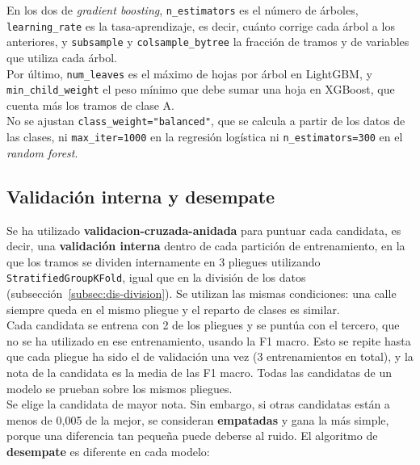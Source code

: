 En los dos de \textit{gradient boosting}, \texttt{n\_estimators} es el número de árboles, \texttt{learning\_rate} es la \gls{tasa-aprendizaje}, es decir, cuánto corrige cada árbol a los anteriores, y \texttt{subsample} y \texttt{colsample\_bytree} la fracción de tramos y de variables que utiliza cada árbol.
\\

Por último, \texttt{num\_leaves} es el máximo de hojas por árbol en LightGBM, y \texttt{min\_child\_weight} el peso mínimo que debe sumar una hoja en XGBoost, que cuenta más los tramos de clase A.
\\

No se ajustan \texttt{class\_\allowbreak weight=\allowbreak "balanced"}, que se calcula a partir de los datos de las clases, ni \texttt{max\_iter=1000} en la regresión logística ni \texttt{n\_estimators=300} en el \textit{random forest}.
\\

\subsection{Validación interna y desempate}
\label{subsec:dis-validacion-interna}

Se ha utilizado \textbf{\gls{validacion-cruzada-anidada}} \parencite{kudasova_nested_cv} para puntuar cada candidata, es decir, una \textbf{validación interna} dentro de cada partición de entrenamiento, en la que los tramos se dividen internamente en 3 pliegues utilizando \texttt{StratifiedGroupKFold}, igual que en la división de los datos (subsección~\ref{subsec:dis-division}). Se utilizan las mismas condiciones: una calle siempre queda en el mismo pliegue y el reparto de clases es similar.
\\

Cada candidata se entrena con 2 de los pliegues y se puntúa con el tercero, que no se ha utilizado en ese entrenamiento, usando la F1 macro. Esto se repite hasta que cada pliegue ha sido el de validación una vez (3 entrenamientos en total), y la nota de la candidata es la media de las F1 macro. Todas las candidatas de un modelo se prueban sobre los mismos pliegues.
\\

Se elige la candidata de mayor nota. Sin embargo, si otras candidatas están a menos de 0,005 de la mejor, se consideran \textbf{empatadas} y gana la más simple, porque una diferencia tan pequeña puede deberse al ruido. El algoritmo de \textbf{desempate} es diferente en cada modelo:

